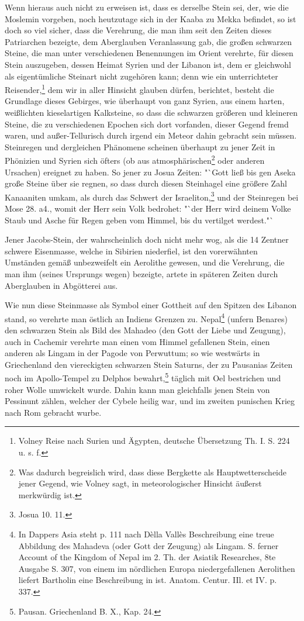 \documentclass[a4paper, 11pt, oneside, polutonikogreek, german]{article}
\begin{document}
Wenn hieraus auch nicht zu erweisen ist, dass es derselbe Stein sei, der, wie die Moslemin vorgeben, noch heutzutage sich in der Kaaba zu Mekka befindet, so ist doch so viel sicher, dass die Verehrung, die man ihm seit den Zeiten dieses Patriarchen bezeigte, dem Aberglauben Veranlassung gab, die großen schwarzen Steine, die man unter verschiedenen Benennungen im Orient verehrte, für diesen Stein auszugeben, dessen Heimat Syrien und der Libanon ist, dem er gleichwohl als eigentümliche Steinart nicht zugehören kann; denn wie ein unterrichteter Reisender,\footnote{Volney Reise nach Surien und Ägypten, deutsche Übersetzung Th. I. S. 224 u. s. f.} dem wir in aller Hinsicht glauben dürfen, berichtet, besteht die Grundlage dieses Gebirges, wie überhaupt von ganz Syrien, aus einem harten, weißlichten kieselartigen Kalksteine, so dass die schwarzen größeren und kleineren Steine, die zu verschiedenen Epochen sich dort vorfanden, dieser Gegend fremd waren, und außer-Tellurisch durch irgend ein Meteor dahin gebracht sein müssen. Steinregen und dergleichen Phänomene scheinen überhaupt zu jener Zeit in Phönizien und Syrien sich öfters (ob aus atmosphärischen\footnote{Was dadurch begreislich wird, dass diese Bergkette als Hauptwetterscheide jener Gegend, wie Volney sagt, in meteorologischer Hinsicht äußerst merkwürdig ist.} oder anderen Ursachen) ereignet zu haben. So jener zu Josua Zeiten: "`Gott ließ bis gen Aseka große Steine über sie regnen, so dass durch diesen Steinhagel eine größere Zahl Kanaaniten umkam, als durch das Schwert der Israeliton,\footnote{Josua 10. 11.} und der Steinregen bei Mose 28. a4., womit der Herr sein Volk bedrohet: "`der Herr wird deinem Volke Staub und Asche für Regen geben vom Himmel, bis du vertilget werdest."`

Jener Jacobs-Stein, der wahrscheinlich doch nicht mehr wog, als die 14 Zentner schwere Eisenmasse, welche in Sibirien niederfiel, ist den vorerwähnten Umständen gemäß unbezweifelt ein Aerolithe gewesen, und die Verehrung, die man ihm (seines Ursprungs wegen) bezeigte, artete in späteren Zeiten durch Aberglauben in Abgötterei aus.

Wie nun diese Steinmasse als Symbol einer Gottheit auf den Spitzen des Libanon stand, so verehrte man östlich an Indiens Grenzen zu. Nepal\footnote{In Dappers Asia steht p. 111 nach Dèlla Vallès Beschreibung eine treue Abbildung des Mahadeva (oder Gott der Zeugung) als Lingam. S. ferner Account of the Kingdom of Nepal im 2. Th. der Asiatik Researches, 8te Ausgabe S. 307, von einem im nördlichen Europa niedergefallenen Aerolithen liefert Bartholin eine Beschreibung in ist. Anatom. Centur. IIl. et IV. p. 337.} (unfern Benares) den schwarzen Stein als Bild des Mahadeo (den Gott der Liebe und Zeugung), auch in Cachemir verehrte man einen vom Himmel gefallenen Stein, einen anderen als Lingam in der Pagode von Perwuttum; so wie westwärts in Griechenland den viereckigten schwarzen Stein Saturns, der zu Pausanias Zeiten noch im Apollo-Tempel zu Delphos bewahrt,\footnote{Pausan. Griechenland B. X., Kap. 24.} täglich mit Oel bestrichen und roher Wolle umwickelt wurde. Dahin kann man gleichfalls jenen Stein von Pessinunt zählen, welcher der Cybele heilig war, und im zweiten punischen Krieg nach Rom gebracht wurbe.
\end{document}
